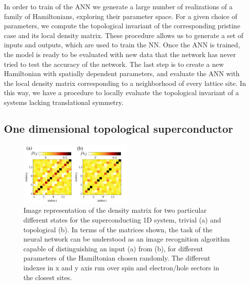 In order to train of the ANN we generate a large number of realizations of a
family of Hamiltonians, exploring their parameter space. For a given choice of
parameters, we compute the topological invariant of the corresponding pristine
case and its local density matrix.
These procedure allows us to generate a set of inputs and outputs, which are
used to train the NN.
Once the ANN is trained, the model is ready to be evaluated with new data that
the network has never tried to test the accuracy of the network.
The last step is to create a new Hamiltonian with spatially dependent
parameters, and evaluate the ANN with the local density matrix corresponding to a
neighborhood of every lattice site.
In this way, we have a procedure to locally evaluate the topological
invariant of a systems lacking translational symmetry.




\subsection{One dimensional topological superconductor}
\label{sec:1d}
\begin{figure}[t!]
\centering
\includegraphics[width=0.5\textwidth]{ann/figures/fig3.pdf}
\vspace{-5pt}
\caption{
Image representation of the density matrix for two particular different states
for the superconducting 1D system, trivial (a) and topological (b). In terms of
the matrices shown, the task of the neural network can be understood as an image
recognition algorithm capable of distinguishing an input (a) from (b), for
different parameters of the Hamiltonian chosen randomly. The different indexes
in x and y axis run over spin and electron/hole sectors in the closest sites.
}
\label{fig3}
\end{figure}

